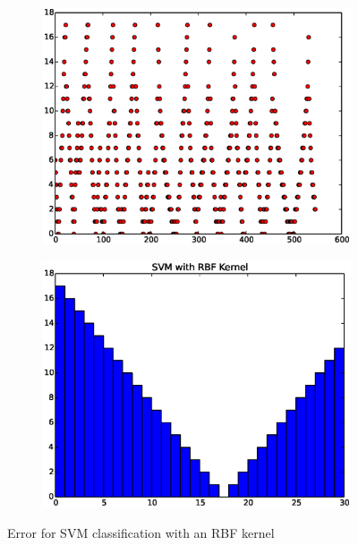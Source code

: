 \documentclass{article}
\begin{document}
\begin{figure}[H]
  \begin{subfigure}[!h]{0.5\textwidth}
    \centering
    \includegraphics[width=\textwidth]{./woodley/SVM_with_RBF_Kernel_heading_plot.eps}
    \label{img:woodley_sample}
  \end{subfigure}
  \begin{subfigure}[!h]{0.5\textwidth}
    \centering
    \includegraphics[width=\textwidth]{./woodley/SVM_with_RBF_Kernel_heading_bar.eps}
    \label{img:woodley_features}
  \end{subfigure}
  \caption{Error for SVM classification with an RBF kernel}
\end{figure}
\end{document}
